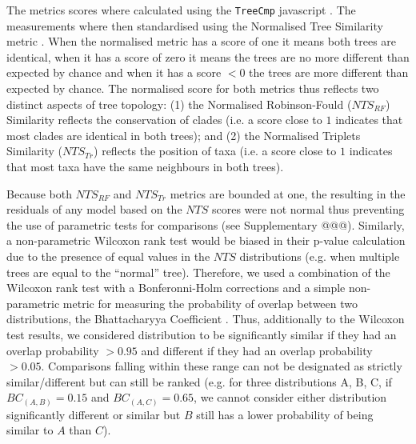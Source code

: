 \documentclass[12pt,letterpaper]{article}
\begin{document}
The metrics scores where calculated using the \texttt{TreeCmp} javascript \citep{Bogdanowicz2012}.
The measurements where then standardised using the Normalised Tree Similarity metric \citep[$NTS$; i.e. centering the metrics scores using the mean metric score for 1000 pairwise comparisons between random trees with $n$ taxa;][]{Bogdanowicz2012,Guillerme2016146}.
When the normalised metric has a score of one it means both trees are identical, when it has a score of zero it means the trees are no more different than expected by chance and when it has a score $<0$ the trees are more different than expected by chance.
The normalised score for both metrics thus reflects two distinct aspects of tree topology: (1) the Normalised Robinson-Fould ($NTS_{RF}$) Similarity reflects the conservation of clades (i.e. a score close to $1$ indicates that most clades are identical in both trees); and (2) the Normalised Triplets Similarity ($NTS_{Tr}$) reflects the position of taxa (i.e. a score close to $1$ indicates that most taxa have the same neighbours in both trees).

Because both $NTS_{RF}$ and $NTS_{Tr}$ metrics are bounded at one, the resulting in the residuals of any model based on the $NTS$ scores were not normal thus preventing the use of parametric tests for comparisons (see Supplementary @@@). %
Similarly, a non-parametric Wilcoxon rank test \citep{hollander2013nonparametric} would be biased in their p-value calculation due to the presence of equal values in the $NTS$ distributions (e.g. when multiple trees are equal to the ``normal'' tree).
Therefore, we used a combination of the Wilcoxon rank test with a Bonferonni-Holm corrections \citep[to ensure our significant results were robust to Type I error rate inflation;][]{holm1979simple} and a simple non-parametric metric for measuring the probability of overlap between two distributions, the Bhattacharyya Coefficient \citep[$BC$;][]{Bhattacharyya,Guillerme2016146,soto2016trace}.
Thus, additionally to the Wilcoxon test results, we considered distribution to be significantly similar if they had an overlap probability $>0.95$ and different if they had an overlap probability $>0.05$.
Comparisons falling within these range can not be designated as strictly similar/different but can still be ranked (e.g. for three distributions A, B, C, if $BC_{(A,B)} = 0.15$ and $BC_{(A,C)} = 0.65$, we cannot consider either distribution significantly different or similar but $B$ still has a lower probability of being similar to $A$ than $C$).
\end{document}
